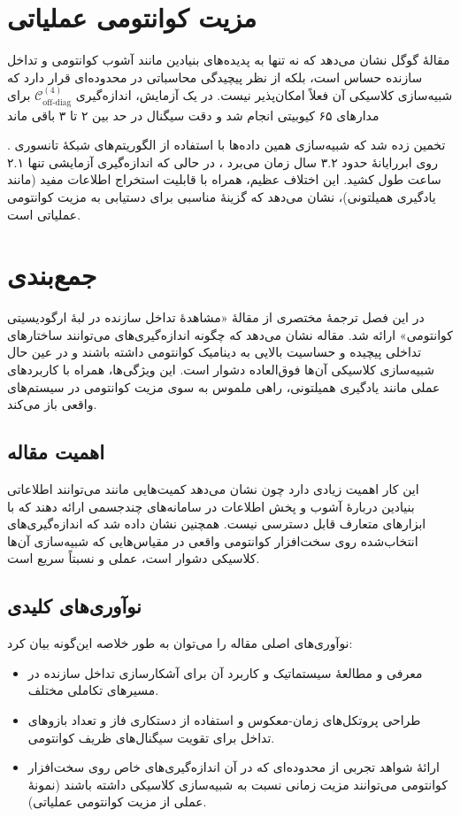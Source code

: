 \section{مزیت کوانتومی عملیاتی}

مقالهٔ گوگل نشان می‌دهد که  نه تنها به پدیده‌های بنیادین مانند آشوب کوانتومی و تداخل سازنده حساس است، بلکه از نظر پیچیدگی محاسباتی در محدوده‌ای قرار دارد که شبیه‌سازی کلاسیکی آن فعلاً امکان‌پذیر نیست. در یک آزمایش، اندازه‌گیری \(\mathcal{C}_{\text{off-diag}}^{(4)}\) برای مدارهای ۶۵ کیوبیتی انجام شد و دقت سیگنال در حد  بین ۲ تا ۳ باقی ماند

. تخمین زده شد که شبیه‌سازی همین داده‌ها با استفاده از الگوریتم‌های شبکهٔ تانسوری روی ابررایانهٔ  حدود ۳.۲ سال زمان می‌برد
، در حالی که اندازه‌گیری آزمایشی تنها ۲.۱ ساعت طول کشید. این اختلاف عظیم، همراه با قابلیت استخراج اطلاعات مفید (مانند یادگیری همیلتونی)، نشان می‌دهد که  گزینهٔ مناسبی برای دستیابی به مزیت کوانتومی عملیاتی است.
\section{جمع‌بندی  }

در این فصل ترجمهٔ مختصری از مقالهٔ «مشاهدهٔ تداخل سازنده در لبهٔ ارگودیسیتی کوانتومی» ارائه شد. مقاله نشان می‌دهد که چگونه اندازه‌گیری‌های  می‌توانند ساختارهای تداخلی پیچیده و حساسیت بالایی به دینامیک کوانتومی داشته باشند و در عین حال شبیه‌سازی کلاسیکی آن‌ها فوق‌العاده دشوار است. این ویژگی‌ها، همراه با کاربردهای عملی مانند یادگیری همیلتونی، راهی ملموس به سوی مزیت کوانتومی در سیستم‌های واقعی باز می‌کند.

\subsection*{اهمیت مقاله}
این کار اهمیت زیادی دارد چون نشان می‌دهد کمیت‌هایی مانند  می‌توانند اطلاعاتی بنیادین دربارهٔ آشوب و پخش اطلاعات در سامانه‌های چندجسمی ارائه دهند که با ابزارهای متعارف قابل دسترسی نیست. همچنین نشان داده شد که اندازه‌گیری‌های انتخاب‌شده روی سخت‌افزار کوانتومی واقعی در مقیاس‌هایی که شبیه‌سازی آن‌ها کلاسیکی دشوار است، عملی و نسبتاً سریع است.

\subsection*{نوآوری‌های کلیدی}
نوآوری‌های اصلی مقاله را می‌توان به طور خلاصه این‌گونه بیان کرد:
\begin{itemize}
  \item معرفی و مطالعهٔ سیستماتیک  و کاربرد آن برای آشکارسازی تداخل سازنده در مسیرهای تکاملی مختلف.
  \item طراحی پروتکل‌های زمان-معکوس و استفاده از دستکاری فاز و تعداد بازوهای تداخل برای تقویت سیگنال‌های ظریف کوانتومی.
  \item ارائهٔ شواهد تجربی از محدوده‌ای که در آن اندازه‌گیری‌های خاص روی سخت‌افزار کوانتومی می‌توانند مزیت زمانی نسبت به شبیه‌سازی کلاسیکی داشته باشند (نمونهٔ عملی از مزیت کوانتومی عملیاتی).
\end{itemize}

